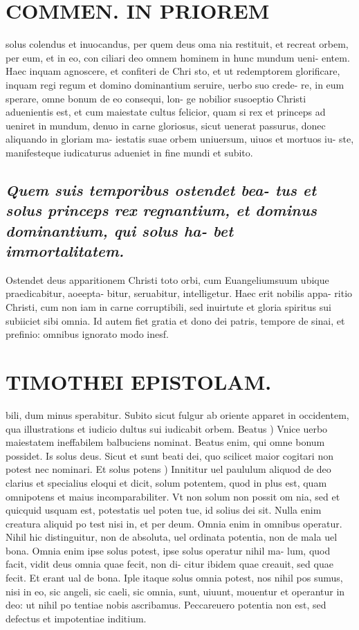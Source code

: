 \documentclass{article}
\begin{document}
\begin{pages}
\section*{COMMEN. IN PRIOREM }
\marginpar{[ p.174 ]}\pstart solus colendus et inuocandus, per quem deus oma nia restituit, et recreat orbem, per eum, et in eo, con ciliari deo omnem hominem in hunc mundum ueni- entem. Haec inquam agnoscere, et confiteri de Chri sto, et ut redemptorem glorificare, inquam regi regum et domino dominantium seruire, uerbo suo crede- re, in eum sperare, omne bonum de eo consequi, lon- ge nobilior susoeptio Christi aduenientis est, et cum maiestate cultus felicior, quam si rex et princeps ad ueniret in mundum, denuo in carne gloriosus, sicut uenerat passurus, donec aliquando in gloriam ma- iestatis suae orbem uniuersum, uiuos et mortuos iu- ste, manifesteque iudicaturus adueniet in fine mundi et subito.  \pend
{}
{}
\subsection*{\textit{Quem suis temporibus ostendet bea- tus et solus princeps rex regnantium, et dominus dominantium, qui solus ha- bet immortalitatem. }}\pstart Ostendet deus apparitionem Christi toto orbi, cum Euangeliumsuum ubique praedicabitur, aoeepta- bitur, seruabitur, intelligetur. Haec erit nobilis appa- ritio Christi, cum non iam in carne corruptibili, sed inuirtute et gloria spiritus sui subiiciet sibi omnia. Id autem fiet gratia et dono dei patris, tempore de sinai, et prefinio: omnibus ignorato modo inesf.  \pend
\section*{TIMOTHEI EPISTOLAM. }
\marginpar{[ p.175 ]}\pstart bili, dum minus sperabitur. Subito sicut fulgur ab oriente apparet in occidentem, qua illustrations et iudicio dultus sui iudicabit orbem.  \pend\pstart Beatus ) Vnice uerbo maiestatem ineffabilem balbuciens nominat. Beatus enim, qui omne bonum possidet. Is solus deus. Sicut et sunt beati dei, quo scilicet maior cogitari non potest nec nominari.  \pend\pstart Et solus potens ) Innititur uel paululum aliquod de deo clarius et specialius eloqui et dicit, solum potentem, quod in plus est, quam omnipotens et maius incomparabiliter. Vt non solum non possit om nia, sed et quicquid usquam est, potestatis uel poten tue, id solius dei sit. Nulla enim creatura aliquid po test nisi in, et per deum. Omnia enim in omnibus operatur. Nihil hic distinguitur, non de absoluta, uel ordinata potentia, non de mala uel bona. Omnia enim ipse solus potest, ipse solus operatur nihil ma- lum, quod facit, vidit deus omnia quae fecit, non di- citur ibidem quae creauit, sed quae fecit. Et erant ual de bona. Iple itaque solus omnia potest, nos nihil pos sumus, nisi in eo, sic angeli, sic caeli, sic omnia, sunt, uiuunt, mouentur et operantur in deo: ut nihil po tentiae nobis ascribamus. Peccareuero potentia non est, sed defectus et impotentiae inditium.  \pend

\end{pages}
\end{document}
